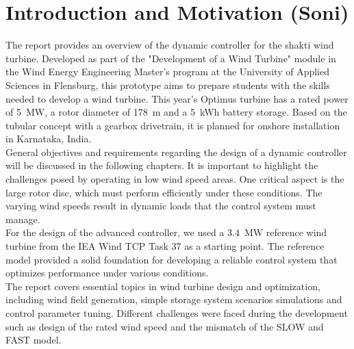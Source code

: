 \chapter{Introduction and Motivation (Soni)}

The report provides an overview of the dynamic controller for the \gls{shakti} wind turbine. Developed as part of the "Development of a Wind Turbine" module in the Wind Energy Engineering Master’s program at the University of Applied Sciences in Flensburg, this prototype aims to prepare students with the skills needed to develop a wind turbine. This year’s Optimus turbine has a rated power of \SI{5}{MW}, a rotor diameter of \SI{178}{m} and a \SI{5}{kWh} battery storage. Based on the tubular concept with a gearbox drivetrain, it is planned for onshore installation in Karnataka, India.
\\[16pt]
General objectives and requirements regarding the design of a dynamic controller will be discussed in the following chapters. It is important to highlight the challenges posed by operating in low wind speed areas. One critical aspect is the large rotor disc, which must perform efficiently under these conditions. The varying wind speeds result in dynamic loads that the control system must manage.
\\[16pt]
For the design of the advanced controller, we used a \SI{3.4}{MW} reference wind turbine from the IEA Wind TCP Task 37 \cite{IEA} as a starting point.
The reference model provided a solid foundation for developing a reliable control system that optimizes performance under various conditions.
\\[16pt]
The report covers essential topics in wind turbine design and optimization, including wind field generation, simple storage system scenarios simulations and control parameter tuning.
Different challenges were faced during the development such as design of the rated wind speed and the mismatch of the \gls{SLOW} and \gls{FAST} model. 
